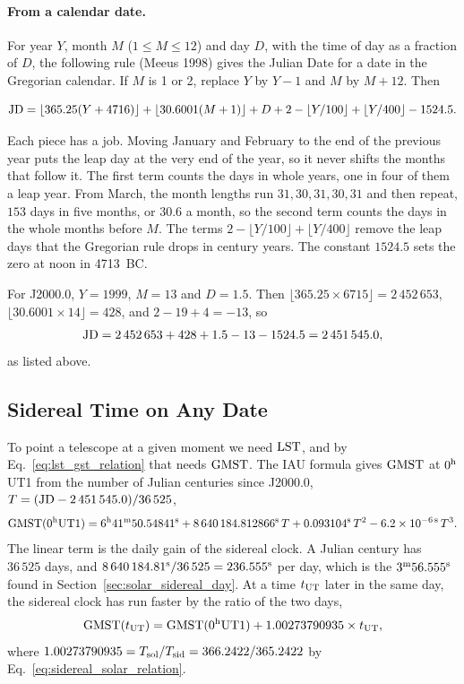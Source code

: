 \paragraph{From a calendar date.} For year $Y$, month $M$ ($1\le M\le12$) and day $D$, with the time of day as a fraction of $D$, the following rule (Meeus 1998) gives the Julian Date for a date in the Gregorian calendar. If $M$ is 1 or 2, replace $Y$ by $Y-1$ and $M$ by $M+12$. Then
\begin{keyresult}
	\begin{equation}
		\mathrm{JD} = \lfloor 365.25(Y + 4716)\rfloor + \lfloor 30.6001(M + 1)\rfloor + D + 2-\lfloor Y/100\rfloor+\lfloor Y/400\rfloor - 1524.5.
		\label{eq:jd_formula_meeus}
	\end{equation}
\end{keyresult}
Each piece has a job. Moving January and February to the end of the previous year puts the leap day at the very end of the year, so it never shifts the months that follow it. The first term counts the days in whole years, one in four of them a leap year. From March, the month lengths run $31,30,31,30,31$ and then repeat, $153$ days in five months, or $30.6$ a month, so the second term counts the days in the whole months before $M$. The terms $2-\lfloor Y/100\rfloor+\lfloor Y/400\rfloor$ remove the leap days that the Gregorian rule drops in century years. The constant $1524.5$ sets the zero at noon in 4713~BC.

For J2000.0, $Y=1999$, $M=13$ and $D=1.5$. Then $\lfloor365.25\times6715\rfloor=2\,452\,653$, $\lfloor30.6001\times14\rfloor=428$, and $2-19+4=-13$, so
\[
\mathrm{JD}=2\,452\,653+428+1.5-13-1524.5=2\,451\,545.0,
\]
as listed above.

\subsection{Sidereal Time on Any Date}
\label{ti:sec:gmst}

To point a telescope at a given moment we need $\mathrm{LST}$, and by Eq.~\eqref{eq:lst_gst_relation} that needs $\mathrm{GMST}$. The IAU formula gives $\mathrm{GMST}$ at $0^{\rm h}$ UT1 from the number of Julian centuries since J2000.0, $T = (\mathrm{JD} - 2\,451\,545.0)/36\,525$,
\begin{equation}
	\mathrm{GMST}(0^{\rm h}\mathrm{UT}1) = 6^{\rm h}41^{\rm m}50.54841^{\rm s} + 8\,640\,184.812866^{\rm s}\,T + 0.093104^{\rm s}\,T^2 - 6.2 \times 10^{-6\,\rm s}\,T^3.
	\label{eq:gmst_iau_formula}
\end{equation}
The linear term is the daily gain of the sidereal clock. A Julian century has $36\,525$ days, and $8\,640\,184.81^{\rm s}/36\,525=236.555^{\rm s}$ per day, which is the $3^{\rm m}56.555^{\rm s}$ found in Section~\ref{sec:solar_sidereal_day}. At a time $t_{\rm UT}$ later in the same day, the sidereal clock has run faster by the ratio of the two days,
\begin{equation}
	\mathrm{GMST}(t_{\rm UT}) = \mathrm{GMST}(0^{\rm h}\mathrm{UT}1) + 1.00273790935 \times t_{\rm UT},
	\label{eq:gmst_instant}
\end{equation}
where $1.00273790935=T_{\rm sol}/T_{\rm sid}=366.2422/365.2422$ by Eq.~\eqref{eq:sidereal_solar_relation}.

